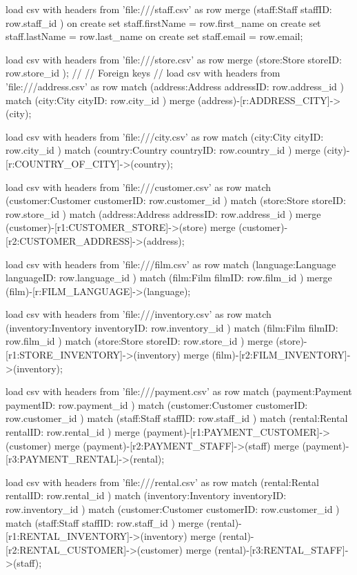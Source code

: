 \begin{cyphercode}
load csv with headers from 'file:///staff.csv' as row
merge (staff:Staff { staffID: row.staff_id }) 
on create set staff.firstName = row.first_name
on create set staff.lastName = row.last_name
on create set staff.email = row.email;

load csv with headers from 'file:///store.csv' as row
merge (store:Store { storeID: row.store_id });
//
// Foreign keys
//
load csv with headers from 'file:///address.csv' as row
match (address:Address { addressID: row.address_id} )
match (city:City { cityID: row.city_id} )
merge (address)-[r:ADDRESS_CITY]->(city);

load csv with headers from 'file:///city.csv' as row
match (city:City { cityID: row.city_id} )
match (country:Country { countryID: row.country_id } )
merge (city)-[r:COUNTRY_OF_CITY]->(country);

load csv with headers from 'file:///customer.csv' as row
match (customer:Customer { customerID: row.customer_id} )
match (store:Store {storeID: row.store_id} )
match (address:Address { addressID: row.address_id} )
merge (customer)-[r1:CUSTOMER_STORE]->(store)
merge (customer)-[r2:CUSTOMER_ADDRESS]->(address);

load csv with headers from 'file:///film.csv' as row
match (language:Language { languageID: row.language_id} )
match (film:Film { filmID: row.film_id} )
merge (film)-[r:FILM_LANGUAGE]->(language);

load csv with headers from 'file:///inventory.csv' as row
match (inventory:Inventory { inventoryID: row.inventory_id} )
match (film:Film { filmID: row.film_id} )
match (store:Store { storeID: row.store_id} )
merge (store)-[r1:STORE_INVENTORY]->(inventory)
merge (film)-[r2:FILM_INVENTORY]->(inventory);

load csv with headers from 'file:///payment.csv' as row
match (payment:Payment { paymentID: row.payment_id} )
match (customer:Customer { customerID: row.customer_id} )
match (staff:Staff { staffID: row.staff_id} )
match (rental:Rental { rentalID: row.rental_id} )
merge (payment)-[r1:PAYMENT_CUSTOMER]->(customer)
merge (payment)-[r2:PAYMENT_STAFF]->(staff)
merge (payment)-[r3:PAYMENT_RENTAL]->(rental);

load csv with headers from 'file:///rental.csv' as row
match (rental:Rental {rentalID: row.rental_id} )
match (inventory:Inventory {inventoryID: row.inventory_id} )
match (customer:Customer {customerID: row.customer_id} )
match (staff:Staff {staffID: row.staff_id} )
merge (rental)-[r1:RENTAL_INVENTORY]->(inventory)
merge (rental)-[r2:RENTAL_CUSTOMER]->(customer)
merge (rental)-[r3:RENTAL_STAFF]->(staff);


\end{cyphercode}
